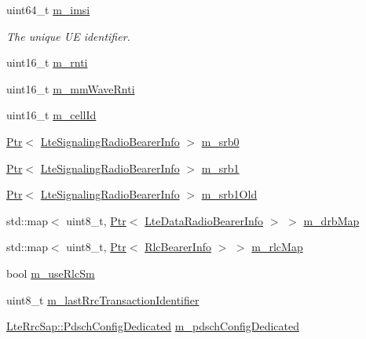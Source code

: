 \begin{DoxyCompactItemize}
uint64\+\_\+t \hyperlink{classns3_1_1LteUeRrc_a1d825677309d17bdf729920f7dafd011}{m\+\_\+imsi}
\begin{DoxyCompactList}\small\item\em The unique UE identifier. \end{DoxyCompactList}\item 
uint16\+\_\+t \hyperlink{classns3_1_1LteUeRrc_a8e078d8ef0ad23e670fe2ef08caab84f}{m\+\_\+rnti}
\item 
uint16\+\_\+t \hyperlink{classns3_1_1LteUeRrc_a0bd0d5c3b49624be1fd217f96910f56a}{m\+\_\+mm\+Wave\+Rnti}
\item 
uint16\+\_\+t \hyperlink{classns3_1_1LteUeRrc_aa9d3317734eea9158371d9fccf3a0c48}{m\+\_\+cell\+Id}
\item 
\hyperlink{classns3_1_1Ptr}{Ptr}$<$ \hyperlink{classns3_1_1LteSignalingRadioBearerInfo}{Lte\+Signaling\+Radio\+Bearer\+Info} $>$ \hyperlink{classns3_1_1LteUeRrc_a1ed76d4e424d770de67c3e39f516ac4d}{m\+\_\+srb0}
\item 
\hyperlink{classns3_1_1Ptr}{Ptr}$<$ \hyperlink{classns3_1_1LteSignalingRadioBearerInfo}{Lte\+Signaling\+Radio\+Bearer\+Info} $>$ \hyperlink{classns3_1_1LteUeRrc_aeb8ad627a3df9126d146bacb6dc3dce6}{m\+\_\+srb1}
\item 
\hyperlink{classns3_1_1Ptr}{Ptr}$<$ \hyperlink{classns3_1_1LteSignalingRadioBearerInfo}{Lte\+Signaling\+Radio\+Bearer\+Info} $>$ \hyperlink{classns3_1_1LteUeRrc_a0f9ba002db6bffa220c9333a9ff09448}{m\+\_\+srb1\+Old}
\item 
std\+::map$<$ uint8\+\_\+t, \hyperlink{classns3_1_1Ptr}{Ptr}$<$ \hyperlink{classns3_1_1LteDataRadioBearerInfo}{Lte\+Data\+Radio\+Bearer\+Info} $>$ $>$ \hyperlink{classns3_1_1LteUeRrc_aa85c5bdde73c2072b2b3053e629bdce0}{m\+\_\+drb\+Map}
\item 
std\+::map$<$ uint8\+\_\+t, \hyperlink{classns3_1_1Ptr}{Ptr}$<$ \hyperlink{classns3_1_1RlcBearerInfo}{Rlc\+Bearer\+Info} $>$ $>$ \hyperlink{classns3_1_1LteUeRrc_a64b3948cda818827b8774d7a2be7ea4f}{m\+\_\+rlc\+Map}
\item 
bool \hyperlink{classns3_1_1LteUeRrc_a724b0f4009ef95b569c52afb344fd5ae}{m\+\_\+use\+Rlc\+Sm}
\item 
uint8\+\_\+t \hyperlink{classns3_1_1LteUeRrc_a01851d519c1a0355b2f0b76ffb540321}{m\+\_\+last\+Rrc\+Transaction\+Identifier}
\item 
\hyperlink{structns3_1_1LteRrcSap_1_1PdschConfigDedicated}{Lte\+Rrc\+Sap\+::\+Pdsch\+Config\+Dedicated} \hyperlink{classns3_1_1LteUeRrc_a2d13b0f35cab56225d1cb206e2da52f1}{m\+\_\+pdsch\+Config\+Dedicated}

\end{DoxyCompactItemize}
